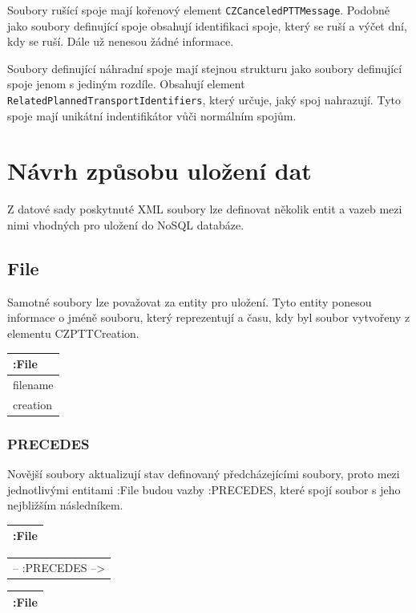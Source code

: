 \documentclass[10pt,xcolor=pdflatex,dvipsnames,table,oneside]{book}
\begin{document}
Soubory rušící spoje mají kořenový element \verb|CZCanceledPTTMessage|. Podobně jako soubory definující spoje obsahují identifikaci spoje, který se ruší
a výčet dní, kdy se ruší. Dále už nenesou žádné informace.

Soubory definující náhradní spoje mají stejnou strukturu jako soubory definující spoje jenom s jediným rozdíle. Obsahují element
\verb|RelatedPlannedTransportIdentifiers|, který určuje, jaký spoj nahrazují. Tyto spoje mají unikátní indentifikátor vůči
normálním spojům.

\chapter{Návrh způsobu uložení dat}
Z datové sady poskytnuté XML soubory lze definovat několik entit a vazeb mezi nimi vhodných pro uložení do NoSQL databáze.
\section{File}
Samotné soubory lze považovat za entity pro uložení. Tyto entity ponesou informace o jméně souboru,
který reprezentují a času, kdy byl soubor vytvořeny z elementu CZPTTCreation.

\vspace{1em}
\begin{tabular}{|l|}
    \hline
    :File \\
    \hline
    filename \\
    creation \\
    \hline
\end{tabular}

\subsection{PRECEDES}
Novější soubory aktualizují stav definovaný předcházejícími soubory, proto mezi jednotlivými entitami :File
budou vazby :PRECEDES, které spojí soubor s jeho nejbližším následníkem.

\vspace{1em}
\begin{tabular}{|l|}
    \hline
    :File \\
    \hline
\end{tabular}
\begin{tabular}{c}
    -- :PRECEDES --> \\
\end{tabular}
\begin{tabular}{|l|}
    \hline
    :File \\
    \hline
\end{tabular}
\end{document}
